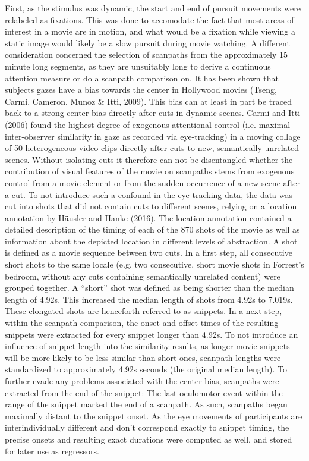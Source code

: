 \documentclass[a4paper, 12pt]{scrreprt}
\begin{document}
First, as the stimulus was dynamic, the start and end of pursuit movements were relabeled as fixations. This was done to accomodate the fact that most areas of interest in a movie are in motion, and what would be a fixation while viewing a static image would likely be a slow pursuit during movie watching. A different consideration concerned the selection of scanpaths from the approximately 15 minute long segments, as they are unsuitably long to derive a continuous attention measure or do a scanpath comparison on. It has been shown that subjects gazes have a bias towards the center in Hollywood movies (Tseng, Carmi, Cameron, Munoz \& Itti, 2009). This bias can at least in part be traced back to a strong center bias directly after cuts in dynamic scenes. Carmi and Itti (2006) found the highest degree of exogenous attentional control (i.e. maximal inter-observer similarity in gaze as recorded via eye-tracking) in a moving collage of 50 heterogeneous video clips directly after cuts to new, semantically unrelated scenes. Without isolating cuts it therefore can not be disentangled whether the contribution of visual features of the movie on scanpaths stems from exogenous control from a movie element or from the sudden occurrence of a new scene after a cut. To not introduce such a confound in the eye-tracking data, the data was cut into shots that did not contain cuts to different scenes, relying on a location annotation by Häusler and Hanke (2016). The location annotation contained a detailed description of the timing of each of the 870 shots of the movie as well as information about the depicted location in different levels of abstraction. A shot is defined as a movie sequence between two cuts. In a first step, all consecutive short shots to the same locale (e.g. two consecutive, short movie shots in Forrest's bedroom, without any cuts containing semantically unrelated content) were grouped together. A “short” shot was defined as being shorter than the median length of 4.92s. This increased the median length of shots from 4.92s to 7.019s. These elongated shots are henceforth referred to as snippets. In a next step, within the scanpath comparison, the onset and offset times of the resulting snippets were extracted for every snippet longer than 4.92s. To not introduce an influence of snippet length into the similarity results, as longer movie snippets will be more likely to be less similar than short ones, scanpath lengths were standardized to approximately 4.92s seconds (the original median length). To further evade any problems associated with the center bias, scanpaths were extracted from the end of the snippet: The last oculomotor event within the range of the snippet marked the end of a scanpath. As such, scanpaths began maximally distant to the snippet onset.
As the eye movements of participants are interindividually different and don't correspond exactly to snippet timing, the precise onsets and resulting exact durations were computed as well, and stored for later use as regressors.
\end{document}
